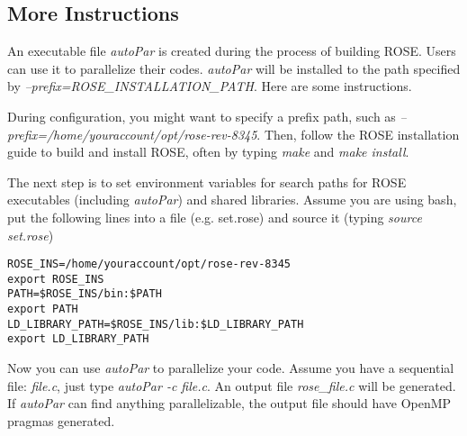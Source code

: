 \subsection{More Instructions}
An executable file \textit{autoPar} is created during the process of
building ROSE.  Users can use it to parallelize their codes.
\textit{autoPar} will be installed to the path specified by
\textit{--prefix=ROSE\_INSTALLATION\_PATH}. 
Here are some instructions.

During configuration, you might want to specify a prefix path, such as
\textit{--prefix=/home/youraccount/opt/rose-rev-8345}.
Then, follow the ROSE installation guide to build and install ROSE,
often by typing \textit{make} and \textit{make install}. 

The next step is to set environment variables for search paths for ROSE executables (including
\textit{autoPar}) and shared libraries. Assume you are using bash, put the
following lines into a file (e.g. set.rose) and source it (typing
\textit{source set.rose})

\begin{verbatim}
ROSE_INS=/home/youraccount/opt/rose-rev-8345
export ROSE_INS
PATH=$ROSE_INS/bin:$PATH
export PATH
LD_LIBRARY_PATH=$ROSE_INS/lib:$LD_LIBRARY_PATH
export LD_LIBRARY_PATH
\end{verbatim}

Now you can use \textit{autoPar} to parallelize your code. 
Assume you have a sequential file: \textit{file.c}, 
just type \textit{autoPar -c file.c}.
An output file \textit{rose\_file.c} will be generated. 
If \textit{autoPar} can find anything parallelizable, the output file should have OpenMP pragmas generated. 

%
